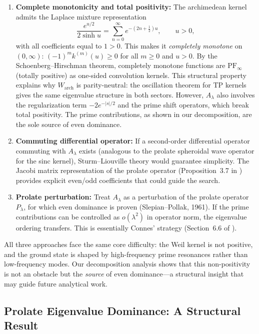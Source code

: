 \documentclass[12pt,a4paper]{article}
\theoremstyle{definition}
\theoremstyle{remark}
\begin{document}
\begin{enumerate}[label=(\Alph*)]
  \item \textbf{Complete monotonicity and total positivity:} The archimedean kernel admits the Laplace mixture representation
  \[ \frac{e^{u/2}}{2\sinh u} = \sum_{n=0}^\infty e^{-(2n+\frac{1}{2})u}, \qquad u > 0, \]
  with all coefficients equal to $1 > 0$. This makes it \emph{completely monotone} on $(0,\infty)$: $(-1)^m k^{(m)}(u) \geq 0$ for all $m \geq 0$ and $u > 0$. By the Schoenberg--Hirschman theorem, completely monotone functions are $\mathrm{PF}_\infty$ (totally positive) as one-sided convolution kernels. This structural property explains why $W_{\mathrm{arch}}$ is parity-neutral: the oscillation theorem for TP kernels gives the same eigenvalue structure in both sectors. However, $A_\lambda$ also involves the regularization term $-2e^{-|s|/2}$ and the prime shift operators, which break total positivity. The prime contributions, as shown in our decomposition, are the sole source of even dominance.

  \item \textbf{Commuting differential operator:} If a second-order differential operator commuting with $A_\lambda$ exists (analogous to the prolate spheroidal wave operator for the sinc kernel), Sturm--Liouville theory would guarantee simplicity. The Jacobi matrix representation of the prolate operator (Proposition~3.7 in \cite{ConnesMoscovici2023}) provides explicit even/odd coefficients that could guide the search.

  \item \textbf{Prolate perturbation:} Treat $A_\lambda$ as a perturbation of the prolate operator $P_\lambda$, for which even dominance is proven (Slepian--Pollak, 1961). If the prime contributions can be controlled as $o(\lambda^2)$ in operator norm, the eigenvalue ordering transfers. This is essentially Connes' strategy (Section~6.6 of \cite{Connes2025}).
\end{enumerate}

All three approaches face the same core difficulty: the Weil kernel is not positive, and the ground state is shaped by high-frequency prime resonances rather than low-frequency modes. Our decomposition analysis shows that this non-positivity is not an obstacle but the \emph{source} of even dominance---a structural insight that may guide future analytical work.

\subsection{Prolate Eigenvalue Dominance: A Structural Result}
\end{document}
